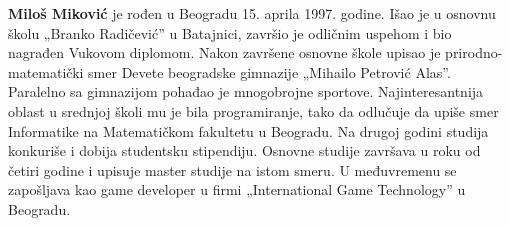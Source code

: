 \documentclass[12pt,oneside]{memoir}
\begin{document}
\begin{biografija}
  \textbf{Miloš Miković} je rođen u Beogradu 15. aprila 1997. godine.
  Išao je u osnovnu školu „Branko Radičević” u Batajnici, završio je odličnim uspehom
  i bio nagrađen Vukovom diplomom. Nakon završene osnovne škole
  upisao je prirodno-matematički smer Devete beogradske gimnazije „Mihailo Petrović Alas”.
  Paralelno sa gimnazijom pohađao je mnogobrojne sportove.
  Najinteresantnija oblast u srednjoj školi mu je bila programiranje, tako da
  odlučuje da upiše smer Informatike na Matematičkom fakultetu u Beogradu.
  Na drugoj godini studija konkuriše i dobija studentsku stipendiju.
  Osnovne studije završava u roku od četiri godine i upisuje master studije na istom smeru.
  U međuvremenu se zapošljava kao game developer u firmi „International Game Technology”
  u Beogradu.
  

\end{biografija}
\end{document}
